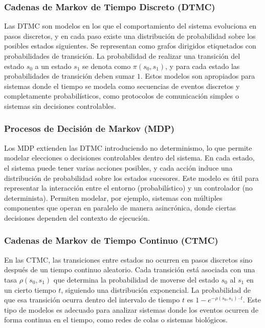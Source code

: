 \documentclass[runningheads]{llncs}
\begin{document}
\subsubsection{Cadenas de Markov de Tiempo Discreto (DTMC)}

Las DTMC son modelos en los que el comportamiento del sistema evoluciona en pasos discretos, y en cada paso existe una distribución de probabilidad sobre los posibles estados siguientes. Se representan como grafos dirigidos etiquetados con probabilidades de transición. La probabilidad de realizar una transición del estado $s_0$ a un estado $s_1$ se denota como $\pi(s_0, s_1)$, y para cada estado las probabilidades de transición deben sumar $1$\cite{KNP02}. Estos modelos son apropiados para sistemas donde el tiempo se modela como secuencias de eventos discretos y completamente probabilísticos, como protocolos de comunicación simples o sistemas sin decisiones controlables.

\subsubsection{Procesos de Decisión de Markov (MDP)}

Los MDP extienden las DTMC introduciendo no determinismo, lo que permite modelar elecciones o decisiones controlables dentro del sistema. En cada estado, el sistema puede tener varias acciones posibles, y cada acción induce una distribución de probabilidad sobre los estados sucesores. Este modelo es útil para representar la interacción entre el entorno (probabilístico) y un controlador (no determinista). Permiten modelar, por ejemplo, sistemas con múltiples componentes que operan en paralelo de manera asincrónica, donde ciertas decisiones dependen del contexto de ejecución.

\subsubsection{Cadenas de Markov de Tiempo Continuo (CTMC)}

En las CTMC, las transiciones entre estados no ocurren en pasos discretos sino después de un tiempo continuo aleatorio. Cada transición está asociada con una tasa $\rho(s_0, s_1)$ que determina la probabilidad de moverse del estado $s_0$ al $s_1$ en un cierto tiempo $t$, siguiendo una distribución exponencial. La probabilidad de que esa transición ocurra dentro del intervalo de tiempo $t$ es $1 - e^{-\rho(s_0,s_1)\cdot t}$. Este tipo de modelos es adecuado para analizar sistemas donde los eventos ocurren de forma continua en el tiempo, como redes de colas o sistemas biológicos.
\end{document}
